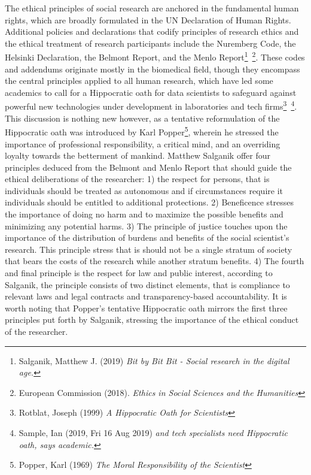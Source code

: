 \documentclass[12pt,a4paper]{article}
\begin{document}
The ethical principles of social research are anchored in the fundamental human rights, which are broadly formulated in the UN Declaration of Human Rights. Additional policies and declarations that codify principles of research ethics and the ethical treatment of research participants include the Nuremberg Code, the Helsinki Declaration, the Belmont Report, and the Menlo Report\footnote{Salganik, Matthew J. (2019) \textit{Bit by Bit Bit - Social research in the digital age.}}\, \footnote{European Commission (2018). \textit{Ethics in Social Sciences and the Humanities}}. These codes and addendums originate mostly in the biomedical field, though they encompass the central principles applied to all human research, which have led some academics to call for a Hippocratic oath for data scientists to safeguard against powerful new technologies under development in laboratories and tech firms\footnote{Rotblat, Joseph (1999) \textit{A Hippocratic Oath for Scientists}}\, \footnote{Sample, Ian (2019, Fri 16 Aug 2019) \textit{and tech specialists need Hippocratic oath, says academic.}}. This discussion is nothing new however, as a tentative reformulation of the Hippocratic oath was introduced by Karl Popper\footnote{Popper, Karl (1969) \textit{The Moral Responsibility of the Scientist}}, wherein he stressed the importance of professional responsibility, a critical mind, and an overriding loyalty towards the betterment of mankind.\newline
Matthew Salganik offer four principles deduced from the Belmont and Menlo Report that should guide the ethical deliberations of the researcher: 1) the respect for persons, that is individuals should be treated as autonomous and if circumstances require it individuals should be entitled to additional protections. 2) Beneficence stresses the importance of doing no harm and to maximize the possible benefits and minimizing any potential harms. 3) The principle of justice touches upon the importance of the distribution of burdens and benefits of the social scientist's research. This principle stress that is should not be a single stratum of society that bears the costs of the research while another stratum benefits. 4) The fourth and final principle is the respect for law and public interest, according to Salganik, the principle consists of two distinct elements, that is compliance to relevant laws and legal contracts and transparency-based accountability. It is worth noting that Popper’s tentative Hippocratic oath mirrors the first three principles put forth by Salganik, stressing the importance of the ethical conduct of the researcher.\newline
\end{document}
